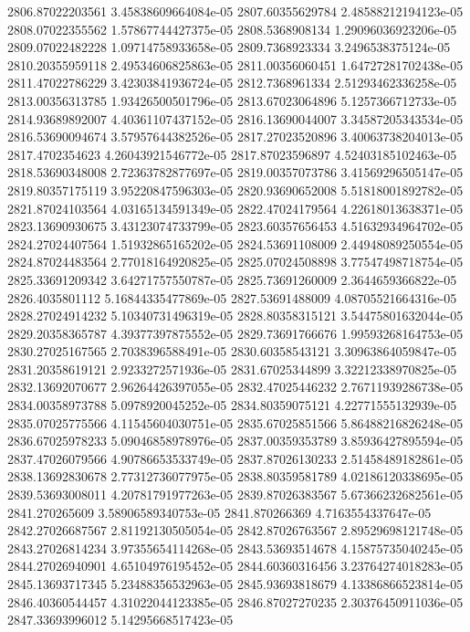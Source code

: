{2806.87022203561 3.45838609664084e-05
2807.60355629784 2.48588212194123e-05
2808.07022355562 1.57867744427375e-05
2808.5368908134 1.29096036923206e-05
2809.07022482228 1.09714758933658e-05
2809.7368923334 3.2496538375124e-05
2810.20355959118 2.49534606825863e-05
2811.00356060451 1.64727281702438e-05
2811.47022786229 3.42303841936724e-05
2812.7368961334 2.51293462336258e-05
2813.00356313785 1.93426500501796e-05
2813.67023064896 5.1257366712733e-05
2814.93689892007 4.40361107437152e-05
2816.13690044007 3.34587205343534e-05
2816.53690094674 3.57957644382526e-05
2817.27023520896 3.40063738204013e-05
2817.4702354623 4.26043921546772e-05
2817.87023596897 4.52403185102463e-05
2818.53690348008 2.72363782877697e-05
2819.00357073786 3.41569296505147e-05
2819.80357175119 3.95220847596303e-05
2820.93690652008 5.51818001892782e-05
2821.87024103564 4.03165134591349e-05
2822.47024179564 4.22618013638371e-05
2823.13690930675 3.43123074733799e-05
2823.60357656453 4.51632934964702e-05
2824.27024407564 1.51932865165202e-05
2824.53691108009 2.44948089250554e-05
2824.87024483564 2.77018164920825e-05
2825.07024508898 3.77547498718754e-05
2825.33691209342 3.64271757550787e-05
2825.73691260009 2.3644659366822e-05
2826.4035801112 5.16844335477869e-05
2827.53691488009 4.08705521664316e-05
2828.27024914232 5.10340731496319e-05
2828.80358315121 3.54475801632044e-05
2829.20358365787 4.39377397875552e-05
2829.73691766676 1.99593268164753e-05
2830.27025167565 2.7038396588491e-05
2830.60358543121 3.30963864059847e-05
2831.20358619121 2.9233272571936e-05
2831.67025344899 3.32212338970825e-05
2832.13692070677 2.96264426397055e-05
2832.47025446232 2.76711939286738e-05
2834.00358973788 5.0978920045252e-05
2834.80359075121 4.22771555132939e-05
2835.07025775566 4.11545604030751e-05
2835.67025851566 5.86488216826248e-05
2836.67025978233 5.09046858978976e-05
2837.00359353789 3.85936427895594e-05
2837.47026079566 4.90786653533749e-05
2837.87026130233 2.51458489182861e-05
2838.13692830678 2.77312736077975e-05
2838.80359581789 4.02186120338695e-05
2839.53693008011 4.20781791977263e-05
2839.87026383567 5.67366232682561e-05
2841.270265609 3.58906589340753e-05
2841.870266369 4.7163554337647e-05
2842.27026687567 2.81192130505054e-05
2842.87026763567 2.89529698121748e-05
2843.27026814234 3.97355654114268e-05
2843.53693514678 4.15875735040245e-05
2844.27026940901 4.65104976195452e-05
2844.60360316456 3.23764274018283e-05
2845.13693717345 5.23488356532963e-05
2845.93693818679 4.13386866523814e-05
2846.40360544457 4.31022044123385e-05
2846.87027270235 2.30376450911036e-05
2847.33693996012 5.14295668517423e-05
}
